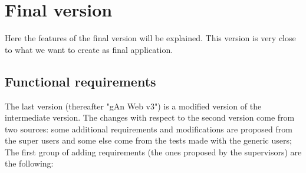 
\chapter{Final version} %

\label{Chapter6} %

Here the features of the final version will be explained. This version is very close to what we want to create as final application.

\section{Functional requirements}

The last version (thereafter "gAn Web v3") is a modified version of the intermediate version. 
The changes with respect to the second version come from two sources: some additional requirements and modifications are proposed from the super users and some else come from the tests made with the generic users; 
The first group of adding requirements (the ones proposed by the supervisors) are the following:

